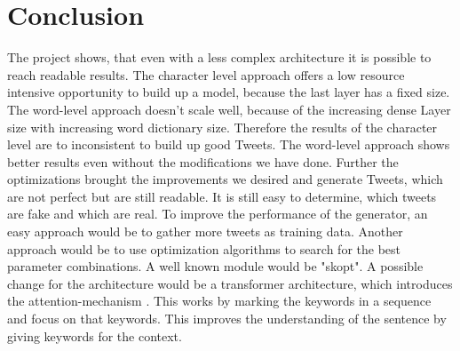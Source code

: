 \documentclass[hidelinks, conference]{IEEEtran}
\begin{document}
\section{Conclusion}

The project shows, that even with a less complex architecture it is possible to reach readable results. The character level approach offers a low resource intensive opportunity to
build up a model, because the last layer has a fixed size. The word-level approach doesn’t scale well, because of the increasing dense Layer size with increasing word dictionary size. Therefore the results of the character level are to inconsistent to build up good Tweets. The word-level approach shows better results even without the modifications we have done. Further the optimizations brought the improvements we desired and generate Tweets, which are not perfect but are still readable. It is still easy to determine, which tweets are fake and which are real. To improve the performance of the generator, an easy approach would be to gather more tweets as training data. Another approach would be to use optimization algorithms to search for the best parameter combinations. A well known module would be "skopt". A possible change for the architecture would be a transformer architecture, which introduces the attention-mechanism \cite{attention}. This works by marking the keywords in a sequence and focus on that keywords. This improves the understanding of the sentence by giving keywords for the context.
\end{document}
